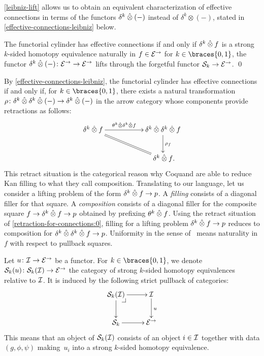 \documentclass[reqno,10pt,a4paper,oneside,draft]{amsart}
\begin{document}
\cref{leibniz-lift} allows us to obtain an equivalent characterization of effective connections in terms of the functors $\delta^k \hatotimes (-)$ instead of $\delta^k \otimes (-)$, stated in \cref{effective-connections-leibniz} below.

\begin{corollary} \label{effective-connections-leibniz}
The functorial cylinder has effective connections if and only if $\kcyl \hatotimes f$ is a strong $k$-sided homotopy equivalence naturally in $f \in \catE^\to$ for $k \in \braces{0, 1}$, \ie the functor $\kcyl \hatotimes (-) \co \catE^\to \to \catE^\to$ lifts through the forgetful functor $\cal{S}_k \to \catE^\to$.
\qed
\end{corollary}

\begin{remark} \label{retraction-for-connections}
By \cref{effective-connections-leibniz}, the functorial cylinder has effective connections if and only if, for $k \in \braces{0, 1}$, there exists a natural transformation $\rho \co \kcyl \hatotimes \kcyl \hatotimes (-) \to \kcyl \hatotimes (-)$ in the arrow category whose components provide retractions as follows:
\begin{equation} \label{retraction-for-connections:0}
\xymatrix@C+3em{
  \kcyl \hatotimes f
  \ar[r]^-{\thetak \hatotimes \kcyl \hatotimes f}
  \ar@{=}[dr]
&
  \kcyl \hatotimes \kcyl \hatotimes f
  \ar[d]^{\rho_f}
\\&
  \kcyl \hatotimes f
\rlap{.}}
\end{equation}
This retract situation is the categorical reason why Coquand \etal\cite{cohen-et-al:cubicaltt} are able to reduce Kan filling to what they call composition.
Translating to our language, let us consider a lifting problem of the form $\kcyl \hatotimes f \to p$.
A \emph{filling} consists of a diagonal filler for that square.
A \emph{composition} consists of a diagonal filler for the composite square $f \to \kcyl \hatotimes f \to p$ obtained by prefixing $\theta^k \hatotimes f$.
Using the retract situation of \eqref{retraction-for-connections:0}, filling for a lifting problem $\kcyl \hatotimes f \to p$ reduces to composition for $\kcyl \hatotimes \kcyl \hatotimes f \to p$.
Uniformity in the sense of~\cite{cohen-et-al:cubicaltt} means naturality in $f$ with respect to pullback squares.
\end{remark}

Let $u \co \cal{I} \to \catE^\to$ be a functor.
For $k \in \braces{0, 1}$, we denote $\cal{S}_k(u) \co \cal{S}_k(\cal{I}) \to \catE^\to$ the category of strong $k$-sided homotopy equivalences relative to $\cal{I}$.
It is induced by the following strict pullback of categories:
\[
\xymatrix{
  \cal{S}_k(\cal{I})
  \ar[r]
  \ar[d]
  \pullback{dr}
&
  \cal{I}
  \ar[d]^{u}
\\
  \cal{S}_k
  \ar[r]
&
  \catE^\to
}
\]
This means that an object of $\cal{S}_k(\cal{I})$ consists of an object $i \in \cal{I}$ together with data $(g, \phi, \psi)$ making~$u_i$ into a strong $k$-sided homotopy equivalence.
\end{document}
